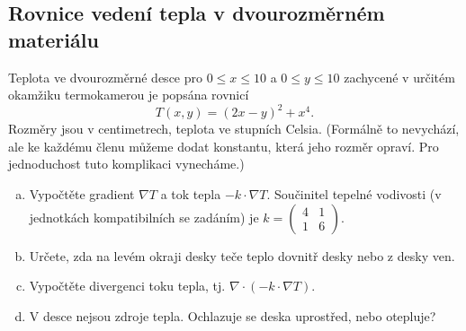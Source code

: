 
\subsection{Rovnice vedení tepla v dvourozměrném materiálu}

Teplota ve dvourozměrné desce pro $0\leq x\leq 10$ a $0\leq y\leq 10$ zachycené v určitém okamžiku termokamerou je popsána rovnicí
  $$T(x,y)=(2x-y)^2+x^4.$$
  Rozměry jsou v centimetrech, teplota ve stupních Celsia. (Formálně to nevychází, ale ke každému členu můžeme dodat konstantu, která jeho rozměr opraví. Pro jednoduchost tuto komplikaci vynecháme.)

\begin{enumerate}[a)]
\item Vypočtěte gradient $\nabla T$  a tok tepla $-k \cdot \nabla T.$
Součinitel tepelné vodivosti (v jednotkách kompatibilních se zadáním) je $k=
  \begin{pmatrix}
    4 & 1\\1&6
  \end{pmatrix}.
$ 
\item Určete, zda na levém okraji desky teče teplo dovnitř desky nebo z desky ven.
\item Vypočtěte divergenci toku tepla, tj. $\nabla\cdot(-k \cdot \nabla T).$
\item V desce nejsou zdroje tepla. Ochlazuje se deska uprostřed, nebo otepluje?
\end{enumerate}

